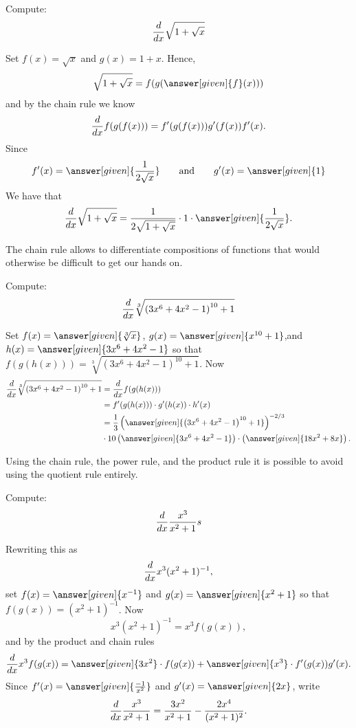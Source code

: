 \documentclass{ximera}
\begin{document}
\begin{example}
Compute:
\[
\frac{d}{\mathop{}\!d x} \sqrt{1+\sqrt{x}}
\]

\begin{explanation}
Set 
$f(x)=\sqrt{x}$ and $g(x)=1+x$. Hence,
\[
\sqrt{1+\sqrt{x}}=f(g(\answer[given]{f}(x)))
\]
and by the chain rule we know
\[
\frac{d}{\mathop{}\!d x} f(g(f(x))) = f'(g(f(x)))g'(f(x))f'(x).
\]
Since 
\[
f'(x) = \answer[given]{\frac{1}{2\sqrt{x}}} \qquad\text{and}\qquad g'(x) = \answer[given]{1}
\]
We have that
\[
\ddx \sqrt{1+\sqrt{x}} = \frac{1}{2\sqrt{1+\sqrt{x}}}\cdot 1\cdot  \answer[given]{\frac{1}{2\sqrt{x}}}.
\]
\end{explanation}
\end{example}

The chain rule allows to differentiate compositions of functions that
would otherwise be difficult to get our hands on.

\begin{example}
Compute:
\[
\frac{d}{\mathop{}\!d x} \sqrt[3]{\left(3x^6+4x^2-1\right)^{10} + 1 }
\]

\begin{explanation}
Set $f(x) = \answer[given]{\sqrt[3]{x}}$, $g(x) = \answer[given]{x^{10}+1}$,and $h(x) = \answer[given]{3x^6+4x^2-1}$
so that $f(g(h(x))) = \sqrt[3]{\left(3x^6+4x^2-1\right)^{10} + 1 }$. Now
\begin{align*}
  \ddx \sqrt[3]{\left(3x^6+4x^2-1\right)^{10} + 1 } &= \ddx f(g(h(x)))\\
  &= f'(g(h(x))) \cdot g'(h(x)) \cdot h'(x)\\
  &= \frac{1}{3}\left(\answer[given]{\left(3x^6+4x^2-1\right)^{10} + 1}\right)^{-2/3} \\ & \cdot 10 \left(\answer[given]{3x^6+4x^2-1}\right) \cdot \left(\answer[given]{18x^2+8x}\right).
\end{align*}
\end{explanation}
\end{example}




Using the chain rule, the power rule, and the product rule it is
possible to avoid using the quotient rule entirely.

\begin{example}
Compute:
\[
\frac{d}{\mathop{}\!d x} \frac{x^3}{x^2+1} s
\] 

\begin{explanation}
Rewriting this as 
\[
\frac{d}{\mathop{}\!d x} x^3(x^2+1)^{-1}, 
\]
set $f(x) = \answer[given]{x^{-1}}$ and $g(x) = \answer[given]{x^2+1}$ so that $f(g(x)) = (x^2 + 1)^{-1}$. Now
\[
x^3(x^2+1)^{-1} = x^3 f(g(x)),
\]
and by the product and chain rules
\[
\ddx x^3 f(g(x)) = \answer[given]{3x^2} \cdot f(g(x))+ \answer[given]{x^3} \cdot f'(g(x))g'(x).
\]
Since $f'(x) = \answer[given]{\frac{-1}{x^2}}$ and $g'(x) = \answer[given]{2x}$, write
\[
\frac{d}{\mathop{}\!d x} \frac{x^3}{x^2+1} = \frac{3x^2}{x^2+1}-\frac{2x^4}{(x^2+1)^2}.
\]
\end{explanation}
\end{example}
\end{document}
